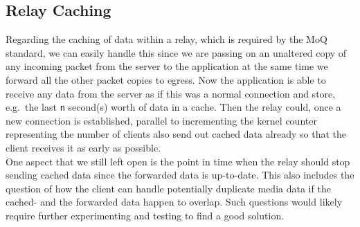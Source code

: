 \subsection{Relay Caching}
Regarding the caching of data within a relay, which is required by the MoQ standard, we can easily
handle this since we are passing on an unaltered copy of any incoming packet from the server to the 
application at the same time we forward all the other packet copies to egress.
Now the application is able to receive any data from the server as if this was a normal connection and 
store, e.g.~the last \verb|n| second(s) worth of data in a cache.
Then the relay could, once a new connection is established, parallel to incrementing the kernel counter 
representing the number of clients also send out cached data already so that the client receives it
as early as possible.
\\
One aspect that we still left open is the point in time when the relay should stop 
sending cached data since the forwarded data is up-to-date.
This also includes the question of how the client can handle potentially duplicate media data if the 
cached- and the forwarded data happen to overlap.
Such questions would likely require further experimenting and testing to find a good solution.
